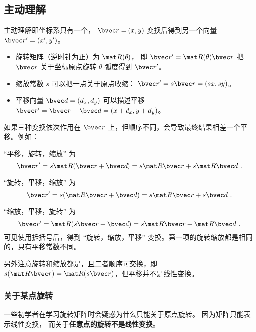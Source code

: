 

\subsection{主动理解}
主动理解即坐标系只有一个， $\bvec r = (x, y)$ 变换后得到另一个向量 $\bvec r' = (x',y')$。

\begin{itemize}
\item 旋转矩阵（逆时针为正）为 $\mat R(\theta)$， 即 $\bvec r' = \mat R(\theta)\bvec r$ 把 $\bvec r$ 关于坐标原点旋转 $\theta$ 弧度得到 $\bvec r'$。
\item 缩放常数 $s$ 可以把一点关于原点收缩： $\bvec r' = s\bvec r = (sx, sy)$。
\item 平移向量 $\bvec d = (d_x,d_y)$ 可以描述平移 $\bvec r' = \bvec r + \bvec d = (x+d_x,y+d_y)$。
\end{itemize}

如果三种变换依次作用在 $\bvec r$ 上，但顺序不同，会导致最终结果相差一个平移。例如：

“平移，旋转，缩放” 为
\begin{equation}
\bvec r' = s\mat R (\bvec r + \bvec d) = s\mat R\bvec r + s\mat R\bvec d~.
\end{equation}

“旋转，平移，缩放” 为
\begin{equation}
\bvec r' = s(\mat R\bvec r + \bvec d) = s\mat R\bvec r + s\bvec d~.
\end{equation}

“缩放，平移，旋转” 为
\begin{equation}
\bvec r' = \mat R(s\bvec r + \bvec d) = s\mat R\bvec r + \mat R\bvec d~.
\end{equation}
可见使用拆括号后，得到 “旋转，缩放，平移” 变换。第一项的旋转缩放都是相同的，只有平移常数不同。

另外注意旋转和缩放都是，且二者顺序可交换，即 $s(\mat R\bvec r) = \mat R (s \bvec r)$，但平移并不是线性变换。

\subsubsection{关于某点旋转}
一些初学者在学习旋转矩阵时会疑惑为什么只能关于原点旋转。 因为矩阵只能表示线性变换， 而关于\textbf{任意点的旋转不是线性变换}。

